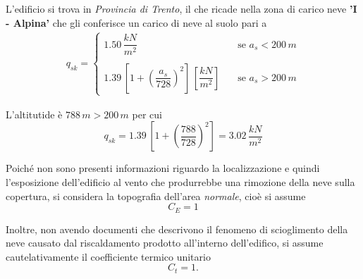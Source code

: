 L'edificio si trova in \emph{Provincia di Trento}, il che ricade nella zona di carico neve \textbf{'I - Alpina'} che gli conferisce un carico di neve al suolo pari a
\begin{align*}
 q_{sk} = 
 \begin{cases}
    1.50\,\dfrac{kN}{m^2}\quad &\text{se } a_s < 200\,\si{m}\\\\
    1.39\,\left[ 1 + \left(\dfrac{a_s}{728}\right)^2\right]\,\left[\dfrac{kN}{m^2}\right]\quad &\text{se } a_s > 200\,\si{m}
 \end{cases}
\end{align*}

L'altitutide è $788\,\si{m} > 200\,\si{m}$ per cui
\[
 q_{sk} = 1.39\,\left[ 1 + \left(\dfrac{788}{728}\right)^2\right] = 3.02\,\dfrac{kN}{m^2}
\]

Poiché non sono presenti informazioni riguardo la localizzazione e quindi l'esposizione dell'edificio al vento che produrrebbe una rimozione della neve sulla copertura, si considera la topografia dell'area \emph{normale}, cioè si assume
\[
 C_E = 1
\]

Inoltre, non avendo documenti che descrivono il fenomeno di scioglimento della neve causato dal riscaldamento prodotto all'interno dell'edifico, si assume cautelativamente il coefficiente termico unitario
\[C_t = 1.\]





